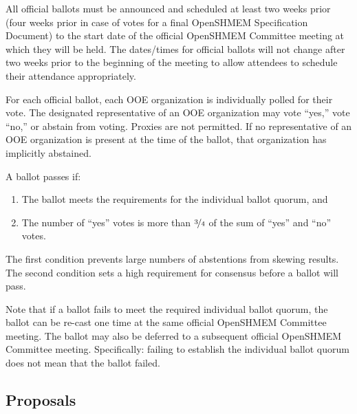 All official ballots must be announced and scheduled at least two
weeks prior (four weeks prior in case of votes for a final OpenSHMEM Specification
Document) to the start date of the official OpenSHMEM Committee meeting at
which they will be held.  The dates/times for official ballots will
not change after two weeks prior to the beginning of the meeting to
allow attendees to schedule their attendance appropriately.

For each official ballot, each OOE organization is individually
polled for their vote.  The designated representative of an OOE
organization may vote ``yes,'' vote ``no,'' or abstain from voting.
Proxies are not permitted.  If no representative of an OOE
organization is present at the time of the ballot, that
organization has implicitly abstained.

A ballot passes if:

\begin{enumerate}
\item The ballot meets the requirements for the individual ballot
  quorum, and
\item The number of ``yes'' votes is more than $\nicefrac{3}{4}$ of
  the sum of ``yes'' and ``no'' votes.
\end{enumerate}

\begin{rationale}
  The first condition prevents large numbers of abstentions from
  skewing results.  The second condition sets a high requirement for
  consensus before a ballot will pass.
\end{rationale}

Note that if a ballot fails to meet the required individual ballot
quorum, the ballot can be re-cast one time at the same official OpenSHMEM
Committee meeting.  The ballot may also be deferred to a subsequent
official OpenSHMEM Committee meeting.  Specifically: failing to establish the
individual ballot quorum does not mean that the ballot failed.


\subsection{Proposals}
\label{subsec:general-text-proposals}

